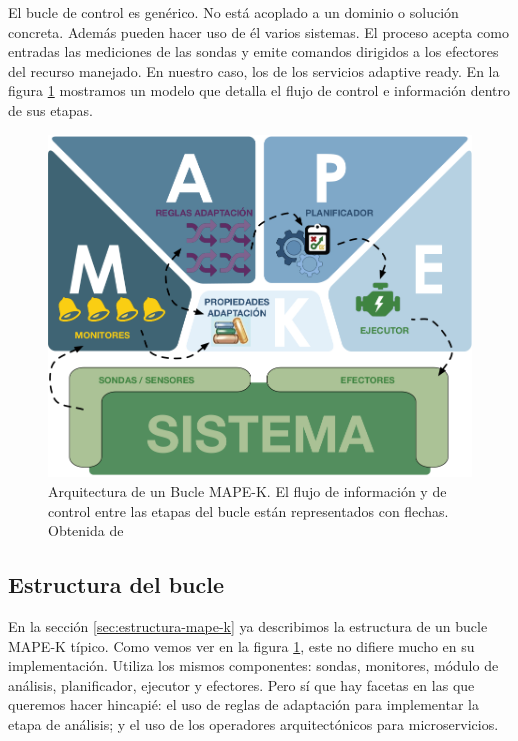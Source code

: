 El bucle de control es genérico. No está acoplado a un dominio o solución concreta. Además pueden hacer uso de él varios sistemas. El proceso acepta como entradas las mediciones de las sondas y emite comandos dirigidos a los efectores del recurso manejado. En nuestro caso, los  de los servicios adaptive ready. En la figura \ref{fig:bucle-mapek3} mostramos un modelo que detalla el flujo de control e información dentro de sus etapas.

\begin{figure}[htb]
  \centering
  \includegraphics[scale=1.1]{cap_introduccion/images/bucle-mape-k}
  \caption[Arquitectura de un Bucle MAPE-K. El flujo de información y de control entre las etapas del bucle están representados con flechas.]{Arquitectura de un Bucle MAPE-K. El flujo de información y de control entre las etapas del bucle están representados con flechas. Obtenida de \cite{fonsEspecificacionSistemasAutoadaptativos2021}}
  \label{fig:bucle-mapek3}
\end{figure}

\subsection{Estructura del bucle}

En la sección \ref{sec:estructura-mape-k} ya describimos la estructura de un bucle MAPE-K típico. Como vemos ver en la figura \ref{fig:bucle-mapek3}, este no difiere mucho en su implementación. Utiliza los mismos componentes: sondas, monitores, módulo de análisis, planificador, ejecutor y efectores. Pero sí que hay facetas en las que queremos hacer hincapié: el uso de reglas de adaptación para implementar la etapa de análisis; y el uso de los operadores arquitectónicos para microservicios.


